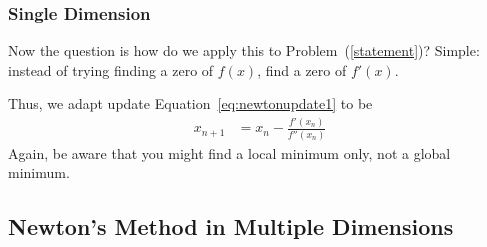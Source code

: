 \documentclass[a4paper,12pt]{scrartcl}
\theoremstyle{definition}
\theoremstyle{remark}
\begin{document}
\subsubsection{Single Dimension}

Now the question is how do we apply this to Problem~(\ref{statement})?
Simple: instead of trying finding a zero of $f(x)$, find a zero of
$f'(x)$.

Thus, we adapt update Equation~\ref{eq:newtonupdate1} to be
\begin{align*}
  x_{n+1} &= x_n - \frac{f'(x_n)}{f''(x_n)}
\end{align*}
Again, be aware that you might find a local minimum only, not a global
minimum.


\subsection{Newton's Method in Multiple Dimensions}
\end{document}
